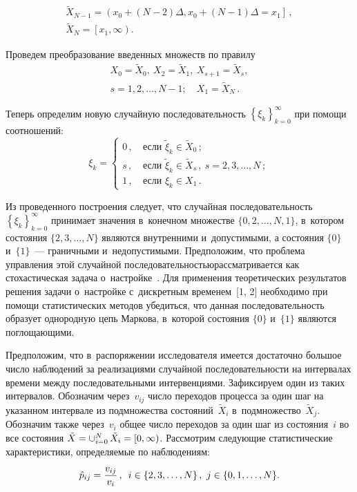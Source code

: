 \begin{multicols}{2}
  \vspace*{-12pt}
  
  \noindent
\begin{multline*}
  \tilde{X}_{N-1} =\left( x_0 +(N-2)\Delta, x_0+(N-1)\Delta=x_1\right]\,,\\ 
\tilde{X}_N=\left[ x_1,\infty\right).
\end{multline*}
  
  Проведем преобразование введенных множеств по правилу
  \begin{multline*}
  X_0=\tilde{X}_0, \ X_2=\tilde{X}_1,\ X_{s+1}=\tilde{X}_s,\\ s=1,2,\ldots, N-1;\quad 
X_1=\tilde{X}_N\,.
\end{multline*}
  
  Теперь определим новую случайную последовательность $\left\{ 
\xi_k\right\}^\infty_{k=0}$ при помощи соотношений: 
  $$
  \xi_k=\begin{cases}
  0\,,&\ \mbox{если } \tilde{\xi}_k\in \tilde{X}_0\,;\\
  s\,, &\ \mbox{если } \tilde{\xi}_k\in \tilde{X}_s\,,\ s=2,3,\ldots, N\,;\\
  1\,, &\ \mbox{если } \xi_k\in X_1\,.
  \end{cases}
  $$ 
  
  Из проведенного построения следует, что случайная последовательность 
$\left\{ \xi_k\right\}^\infty_{k=0}$ принимает значения в~конечном множестве 
$\{ 0,2,\ldots , N, 1\}$, в~котором состояния $\{2,3,\ldots , N\}$ являются 
внутренними и~допустимыми, а состояния $\{0\}$ и~$\{1\}$~--- граничными 
и~недопустимыми. Предположим, что проб\-ле\-ма управ\-ле\-ния этой случайной 
последовательностью\linebreak рассматривается как стохастическая задача 
о~настройке~\cite{1-shn}. Для применения теоретических результатов решения 
задачи о~настройке с~дискретным временем~[1, 2] необходимо при помощи 
\mbox{статистических} методов убедиться, что данная последовательность образует 
однородную цепь Маркова, в~которой состояния $\{0\}$ и~$\{1\}$ являются 
поглощающими.
  
  Предположим, что в~распоряжении исследователя имеется достаточно 
большое число наблюдений за реализациями случайной по\-сле\-до\-ва\-тель\-ности на 
интервалах времени между \mbox{последовательными} интервенциями. Зафиксируем 
один из таких интервалов. Обозначим через~$v_{ij}$ чис\-ло переходов процесса 
за один шаг на указанном интервале из подмножества со\-сто\-яний~$\tilde{X}_i$ 
в~подмножество~$\tilde{X}_j$. Обозначим так\-же через~$v_i$ общее число 
переходов за один шаг из состояния~$i$ во все со\-сто\-яния $\tilde{X}\hm= 
\mathop{\cup}\nolimits^N_{i=0} \tilde{X}_i\hm= [0,\infty)$. Рассмотрим 
сле\-ду\-ющие статистические характеристики, опре\-де\-ля\-емые по наблюдениям: 
  $$
  \hat{p}_{ij} =\displaystyle\frac{\displaystyle v_{ij}\mathstrut}{\displaystyle v_i\mathstrut}\,,\enskip i \in \{2,3,\ldots , N\}\,,\ j\in \{0,1,\ldots , 
N\}.
  $$
  

\end{multicols}
